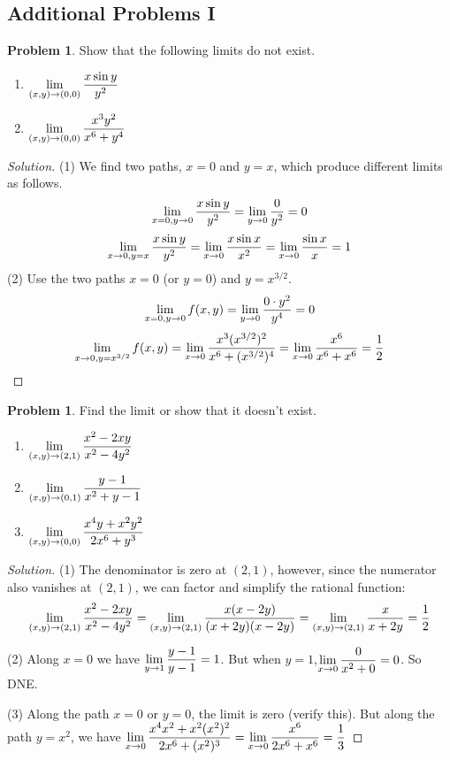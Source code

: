\documentclass[12pt]{amsart}%
\theoremstyle{plain}
\theoremstyle{definition}
\newtheorem{prob}[theorem]{Problem}
\theoremstyle{special}
\newcommand{\sol}[1]{
{\begin{proof}[Solution]#1\end{proof}}
}
\newcommand{\Prob}[1]{\begin{tcolorbox}%
\begin{prob}
	#1
\end{prob}
\end{tcolorbox}	
}
\begin{document}
\begin{appendices}\section{Additional Problems I}
\Prob{Show that the following limits do not exist.
\begin{enumerate}
	\item $\displaystyle\lim_{(x,y)\to (0,0)}{x\sin y\over y^2}$\vspace{0.3cm}
	\item $\displaystyle\lim_{(x,y)\to(0,0)}{ x^3y^2\over x^6+y^4}$
\end{enumerate}
}
\sol{(1) We find two paths, $x=0$ and $y=x$, which produce different limits as follows. \[\lim_{x=0,y\to 0}{{x\sin y}\over y^2}=\lim_{y\to 0}{0\over y^2}=0\]
\[\lim_{x\to 0,y=x}{{x\sin y}\over y^2}=\lim_{x\to 0}{x\sin x\over x^2}=\lim_{x\to 0}{\sin x\over x}=1\]
(2) Use the two paths $x=0$ (or $y=0$) and $y=x^{3/2}$.
\[\lim_{x=0,y\to 0}f(x,y)=\lim_{y\to 0}{0\cdot y^2\over y^4}=0\]
\[\lim_{x\to 0,y= x^{3/2}}f(x,y)=\lim_{x\to 0}{x^3 (x^{3/2})^2\over x^6+(x^{3/2})^4}=\lim_{x\to 0}{x^6\over x^6+x^6}={1\over 2}\qedhere\]}
\Prob{Find the limit or show that it doesn't exist.
\begin{enumerate}
	\item $\displaystyle \lim_{(x,y)\to(2,1)}{x^2-2xy\over x^2-4y^2}$\vspace{0.3cm}
	\item $\displaystyle\lim_{(x,y)\to (0,1) }{y-1\over x^2+y-1}$\vspace{0.3cm}
	\item $\displaystyle\lim_{(x,y)\to (0,0)}{x^4y+x^2y^2\over 2x^6+y^3}$
\end{enumerate}
}
\sol{(1) The denominator is zero at $(2,1)$, however, since the numerator also vanishes at $(2,1)$, we can factor and simplify the rational function:
\[\lim_{(x,y)\to(2,1)}{x^2-2xy\over x^2-4y^2}= \lim_{(x,y)\to(2,1)}{x(x-2y)\over (x+2y)(x-2y)}= \lim_{(x,y)\to(2,1)}{x\over x+2y}={1\over 2}\]

(2) Along $x=0$ we have
\(\displaystyle \lim_{y\to 1}{y-1\over y-1}=1\). But when $y=1$,\(\displaystyle \lim_{x\to 0}{0\over x^2+0}=0\). So DNE.

(3) Along the path $x=0$ or $y=0$, the limit is zero (verify this). But along the path $y=x^2$, we have
\(\displaystyle \lim_{x\to 0}{x^4x^2+x^2(x^2)^2\over 2x^6+(x^2)^3}=\lim_{x\to 0}{x^6\over 2x^6+x^6}={1\over 3}\)
}
\end{appendices}
\end{document}
